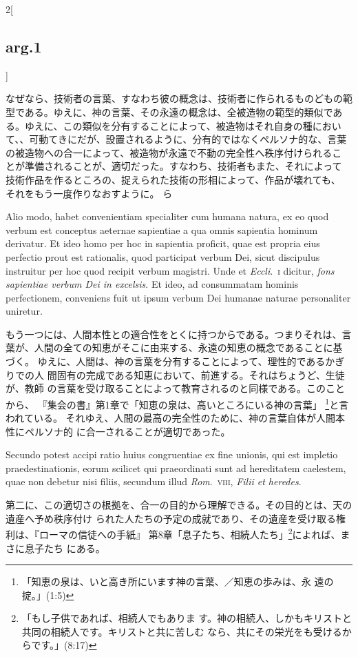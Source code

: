 \documentclass[paper=a4paper,fontsize=10pt,jafontsize=9pt,titlepage]{jlreq}
\begin{document}
\begin{paracol}{2}[\subsection{arg.1}]
\switchcolumn

なぜなら、技術者の言葉、すなわち彼の概念は、技術者に作られるものどもの範
 型である。ゆえに、神の言葉、その永遠の概念は、全被造物の範型的類似であ
 る。ゆえに、この類似を分有することによって、被造物はそれ自身の種におい
 て、、可動てきにだが、設置されるように、分有的ではなくペルソナ的な、言葉
 の被造物への合一によって、被造物が永遠で不動の完全性へ秩序付けられるこ
 とが準備されることが、適切だった。すなわち、技術者もまた、それによって
 技術作品を作るところの、捉えられた技術の形相によって、作品が壊れても、
 それをもう一度作りなおすように。
 ら

\switchcolumn*

Alio modo, habet convenientiam specialiter
cum humana natura, ex eo quod verbum est conceptus aeternae sapientiae a
qua omnis sapientia hominum derivatur. Et ideo homo per hoc in sapientia
proficit, quae est propria eius perfectio prout est rationalis, quod
participat verbum Dei, sicut discipulus instruitur per hoc quod recipit
verbum magistri. Unde et {\itshape Eccli}.~{\scshape i} dicitur, {\itshape fons sapientiae verbum Dei in
excelsis}. 
Et ideo, ad consummatam hominis perfectionem, conveniens fuit
ut ipsum verbum Dei humanae naturae personaliter uniretur.

\switchcolumn

もう一つには、人間本性との適合性をとくに持つからである。つまりそれは、言
 葉が、人間の全ての知恵がそこに由来する、永遠の知恵の概念であることに基
 づく。
ゆえに、人間は、神の言葉を分有することによって、理性的であるかぎりでの人
 間固有の完成である知恵において、前進する。それはちょうど、生徒が、教師
 の言葉を受け取ることによって教育されるのと同様である。このことから、
 『集会の書』第1章で「知恵の泉は、高いところにいる神の言葉」
 \footnote{「知恵の泉は、いと高き所にいます神の言葉、／知恵の歩みは、永
 遠の掟。」(1:5) }と言われている。
それゆえ、人間の最高の完全性のために、神の言葉自体が人間本性にペルソナ的
 に合一されることが適切であった。

\switchcolumn*

Secundo
potest accipi ratio huius congruentiae ex fine unionis, qui est impletio
praedestinationis, eorum scilicet qui praeordinati sunt ad hereditatem
caelestem, quae non debetur nisi filiis, secundum illud {\itshape
 Rom}.~{\scshape viii}, {\itshape Filii et heredes}.

\switchcolumn

第二に、この適切さの根拠を、合一の目的から理解できる。その目的とは、天の遺産へ予め秩序付け
 られた人たちの予定の成就であり、その遺産を受け取る権利は、『ローマの信徒への手紙』
 第8章「息子たち、相続人たち」\footnote{「もし子供であれば、相続人でもありま
 す。神の相続人、しかもキリストと共同の相続人です。キリストと共に苦しむ
 なら、共にその栄光をも受けるからです。」(8:17)}によれば、まさに息子たち
 にある。


\end{paracol}
\end{document}
